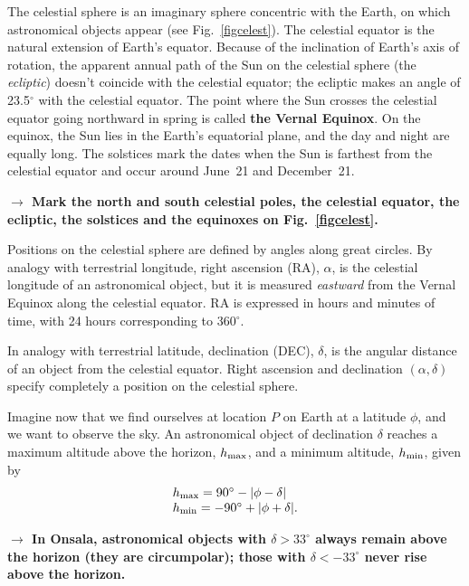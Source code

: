The celestial sphere is an imaginary sphere concentric with the Earth, on which
astronomical objects appear (see Fig.~\ref{figcelest}). 
The celestial equator is the
natural extension of Earth's equator. Because of the inclination of 
Earth's axis of rotation, the apparent annual path of the Sun
on the celestial sphere (the {\em ecliptic}) doesn't  coincide with the 
celestial equator; the ecliptic makes an angle of 23.5$^\circ$
with the celestial equator. The point where the Sun crosses the
celestial
equator going northward in spring is called {\bf the Vernal 
Equinox}. 
On the equinox, the Sun lies
in the Earth's equatorial plane, and the day and night are equally
long. The solstices mark the dates when the Sun is farthest from 
the celestial equator and occur around June~21 and December~21. 

\medskip
{\bf{$\rightarrow$ Mark the north and south celestial poles, 
the celestial equator, the ecliptic,
the solstices and the equinoxes on Fig.~\ref{figcelest}.}}
\medskip

Positions on the celestial sphere are defined by angles along 
great circles. By analogy with terrestrial longitude, 
right ascension (RA), $\alpha$, is the celestial longitude of an
astronomical object, 
but it is measured {\em eastward} from the Vernal Equinox
along the celestial equator. RA is expressed
in hours and minutes of time, with 24 hours corresponding 
to 360$^\circ$. 

In analogy with terrestrial latitude, declination (DEC), $\delta$, 
is the angular distance of an object from the celestial equator. 
Right ascension and declination $(\alpha,\delta)$ specify completely
a position on the celestial sphere. 

Imagine now that we find ourselves at location $P$ on Earth at a 
latitude $\phi$, and we want to observe the sky. 
An astronomical object
of declination $\delta$ reaches a maximum altitude above
the horizon, $h_{\rm max}$, and a minimum altitude, $h_{\rm min}$,
given by
\begin{equation}
\begin{array}{l}
h_{\rm max} = 90^\circ -|\phi-\delta| \\
h_{\rm min} = -90^\circ +|\phi+\delta|. 
\end{array}
\end{equation}

{\bf{$\rightarrow$ In Onsala, astronomical objects with $\delta > 33^\circ$
always remain above the horizon (they are circumpolar); those with $\delta <
-33^\circ$ never rise above the horizon.}}


